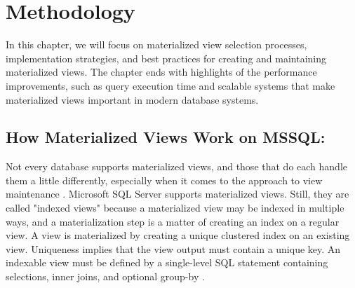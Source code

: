\section{Methodology}\vspace{.4cm}
In this chapter, we will focus on materialized view selection processes, implementation strategies, and best practices for creating and maintaining materialized views. The chapter ends with highlights of the performance improvements, such as query execution time and scalable systems that make materialized views important in modern database systems.

 \subsection{How Materialized Views Work on MSSQL:} Not every database supports materialized views, and those that do each handle them a little differently, especially when it comes to the approach to view maintenance \cite{hattemer-2020}. Microsoft SQL Server supports materialized views. Still, they are called "indexed views" because a materialized view may be indexed in multiple ways, and a materialization step is a matter of creating an index on a regular view. A view is materialized by creating a unique clustered index on an existing view. Uniqueness implies that the view output must contain a unique key. An indexable view must be defined by a single-level SQL statement containing selections, inner joins, and optional group-by \cite{goldstein-2001}.\vspace{0.8cm}

